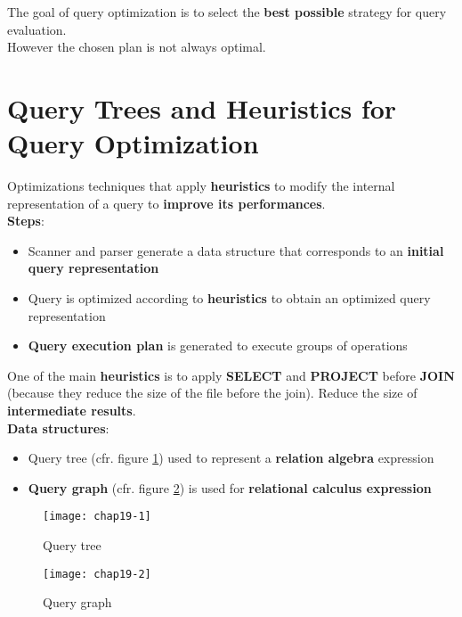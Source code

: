 The goal of query optimization is to select the \textbf{best possible} strategy for query evaluation. \\

However the chosen plan is not always optimal.

\section{Query Trees and Heuristics for Query Optimization}

Optimizations techniques that apply \textbf{heuristics} to modify the internal representation of a query to \textbf{improve its performances}.\\

\textbf{Steps}:

\begin{itemize}
    \item Scanner and parser generate a data structure that corresponds to an \textbf{initial query representation}
    \item Query is optimized according to \textbf{heuristics} to obtain an optimized query representation
    \item \textbf{Query execution plan} is generated to execute groups of operations
\end{itemize}

One of the main \textbf{heuristics} is to apply \textbf{SELECT} and \textbf{PROJECT} before \textbf{JOIN} (because they reduce the size of the file before the join). Reduce the size of \textbf{intermediate results}.\\

\textbf{Data structures}:
\begin{itemize}
    \item {Query tree} (cfr. figure \ref{fig:tree}) used to represent a \textbf{relation algebra} expression
    \item \textbf{Query graph} (cfr. figure \ref{fig:graph}) is used for \textbf{relational calculus expression}
\end{itemize}

\begin{figure}[!h]
    \centering
    \texttt{[image: chap19-1]}
    \caption{Query tree}
    \label{fig:tree}
\end{figure}

\begin{figure}[!h]
    \centering
    \texttt{[image: chap19-2]}
    \caption{Query graph}
    \label{fig:graph}
\end{figure}


